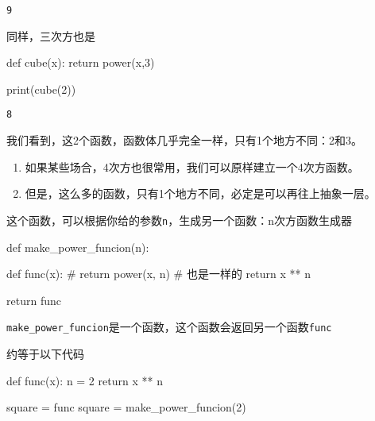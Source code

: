 \documentclass[
  letterpaper,
  DIV=11,
  numbers=noendperiod]{scrreprt}
\newenvironment{Shaded}{\begin{snugshade}}{\end{snugshade}}
\newcommand{\BuiltInTok}[1]{\textcolor[rgb]{0.00,0.23,0.31}{#1}}
\newcommand{\CommentTok}[1]{\textcolor[rgb]{0.37,0.37,0.37}{#1}}
\newcommand{\ControlFlowTok}[1]{\textcolor[rgb]{0.00,0.23,0.31}{#1}}
\newcommand{\DecValTok}[1]{\textcolor[rgb]{0.68,0.00,0.00}{#1}}
\newcommand{\KeywordTok}[1]{\textcolor[rgb]{0.00,0.23,0.31}{#1}}
\newcommand{\NormalTok}[1]{\textcolor[rgb]{0.00,0.23,0.31}{#1}}
\newcommand{\OperatorTok}[1]{\textcolor[rgb]{0.37,0.37,0.37}{#1}}
\providecommand{\tightlist}{%
  \setlength{\itemsep}{0pt}\setlength{\parskip}{0pt}}\usepackage{longtable,booktabs,array}
\begin{document}
\begin{verbatim}
9
\end{verbatim}

同样，三次方也是

\begin{Shaded}
\begin{Highlighting}[]
\KeywordTok{def}\NormalTok{ cube(x):}
    \ControlFlowTok{return}\NormalTok{ power(x,}\DecValTok{3}\NormalTok{)}

\BuiltInTok{print}\NormalTok{(cube(}\DecValTok{2}\NormalTok{))}
\end{Highlighting}
\end{Shaded}

\begin{verbatim}
8
\end{verbatim}

我们看到，这2个函数，函数体几乎完全一样，只有1个地方不同：2和3。

\begin{enumerate}
\def\labelenumi{\arabic{enumi}.}
\tightlist
\item
  如果某些场合，4次方也很常用，我们可以原样建立一个4次方函数。
\item
  但是，这么多的函数，只有1个地方不同，必定是可以再往上抽象一层。
\end{enumerate}

这个函数，可以根据你给的参数\texttt{n}，生成另一个函数：n次方函数生成器

\begin{Shaded}
\begin{Highlighting}[]
\KeywordTok{def}\NormalTok{ make\_power\_funcion(n):}
    
    \KeywordTok{def}\NormalTok{ func(x):}
        \CommentTok{\# return power(x, n) \# 也是一样的}
        \ControlFlowTok{return}\NormalTok{ x }\OperatorTok{**}\NormalTok{ n }
    
    \ControlFlowTok{return}\NormalTok{ func}
\end{Highlighting}
\end{Shaded}

\texttt{make\_power\_funcion}是一个函数，这个函数会返回另一个函数\texttt{func}

\begin{Shaded}
\begin{Highlighting}[]
\CommentTok{\textquotesingle{}\textquotesingle{}\textquotesingle{}}
\CommentTok{约等于以下代码}

\CommentTok{def func(x):}
\CommentTok{    n = 2}
\CommentTok{    return x ** n}

\CommentTok{square = func}
\CommentTok{\textquotesingle{}\textquotesingle{}\textquotesingle{}}
\NormalTok{square }\OperatorTok{=}\NormalTok{ make\_power\_funcion(}\DecValTok{2}\NormalTok{)}
\end{Highlighting}
\end{Shaded}
\end{document}
